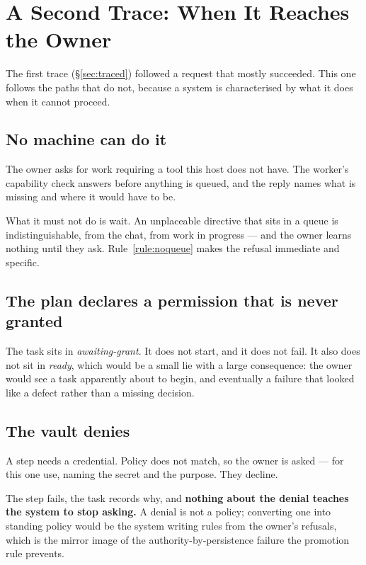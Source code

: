 \documentclass[11pt]{article}
\begin{document}
\section{A Second Trace: When It Reaches the Owner}
\label{sec:trace2}

The first trace (\S\ref{sec:traced}) followed a request that mostly succeeded. This one follows the paths that do not, because a system is characterised by what it does when it cannot proceed.

\subsection{No machine can do it}

The owner asks for work requiring a tool this host does not have. The worker's capability check answers before anything is queued, and the reply names what is missing and where it would have to be.

What it must not do is wait. An unplaceable directive that sits in a queue is indistinguishable, from the chat, from work in progress --- and the owner learns nothing until they ask. Rule~\ref{rule:noqueue} makes the refusal immediate and specific.

\subsection{The plan declares a permission that is never granted}

The task sits in \emph{awaiting-grant}. It does not start, and it does not fail. It also does not sit in \emph{ready}, which would be a small lie with a large consequence: the owner would see a task apparently about to begin, and eventually a failure that looked like a defect rather than a missing decision.

\subsection{The vault denies}

A step needs a credential. Policy does not match, so the owner is asked --- for this one use, naming the secret and the purpose. They decline.

The step fails, the task records why, and \textbf{nothing about the denial teaches the system to stop asking.} A denial is not a policy; converting one into standing policy would be the system writing rules from the owner's refusals, which is the mirror image of the authority-by-persistence failure the promotion rule prevents.
\end{document}
